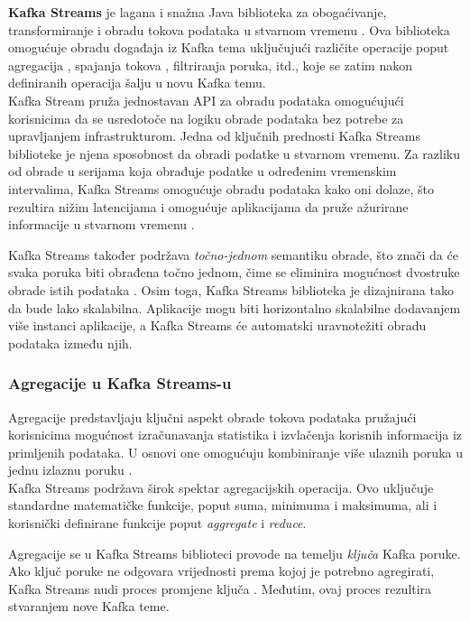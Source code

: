 \documentclass[times, utf8, diplomski]{fer}
\begin{document}
\textbf{Kafka Streams} je lagana i snažna Java biblioteka za obogaćivanje, transformiranje i obradu tokova podataka u stvarnom vremenu \citep{seymour_mastering_2021}. Ova biblioteka omogućuje obradu događaja iz Kafka tema uključujući različite operacije poput agregacija , spajanja tokova , filtriranja poruka, itd., koje se zatim nakon definiranih operacija šalju u novu Kafka temu.\\

Kafka Stream pruža jednostavan API za obradu podataka omogućujući korisnicima da se usredotoče na logiku obrade podataka bez potrebe za upravljanjem infrastrukturom. Jedna od ključnih prednosti Kafka Streams biblioteke je njena sposobnost da obradi podatke u stvarnom vremenu. 
Za razliku od obrade u serijama  koja obrađuje podatke u određenim vremenskim intervalima, Kafka Streams omogućuje obradu podataka kako oni dolaze, što rezultira nižim latencijama i omogućuje aplikacijama da pruže ažurirane informacije u stvarnom vremenu \citep{seymour_mastering_2021}.

Kafka Streams također podržava \emph{\glqq točno-jednom\grqq} semantiku obrade, što znači da će svaka poruka biti obrađena točno jednom, čime se eliminira mogućnost dvostruke obrade istih podataka \citep{narkhede_exactly-once_2017}.
Osim toga, Kafka Streams biblioteka je dizajnirana tako da bude lako skalabilna. Aplikacije mogu biti horizontalno skalabilne dodavanjem više instanci aplikacije, a Kafka Streams će automatski uravnotežiti obradu podataka između njih.

\subsubsection{Agregacije u Kafka Streams-u}

Agregacije predstavljaju ključni aspekt obrade tokova podataka pružajući korisnicima mogućnost izračunavanja statistika i izvlačenja korisnih informacija iz primljenih podataka. U osnovi one omogućuju kombiniranje više ulaznih poruka u jednu izlaznu poruku \citep{seymour_mastering_2021}.\\

Kafka Streams podržava širok spektar agregacijskih operacija. Ovo uključuje standardne matematičke funkcije, poput suma, minimuma i maksimuma, ali i korisnički definirane funkcije poput \emph{aggregate} i \emph{reduce}.

Agregacije se u Kafka Streams biblioteci provode na temelju \emph{ključa} Kafka poruke. Ako ključ poruke ne odgovara vrijednosti prema kojoj je potrebno agregirati, Kafka Streams nudi proces promjene ključa . Međutim, ovaj proces rezultira stvaranjem nove Kafka teme.
\end{document}
